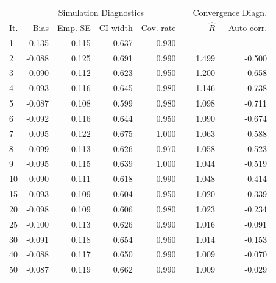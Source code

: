 \documentclass[article]{jss}
\begin{document}
\begin{table}[ht]
\centering
\begin{tabular}{lrrrrrrr}
  \hline
  &\multicolumn{4}{c}{Simulation Diagnostics}& & \multicolumn{2}{c}{Convergence Diagn.} \\
  \cline{2-5} \cline{7-8}
It. & Bias & Emp. SE & CI width & Cov. rate & & $\widehat{R}$ & Auto-corr. \\ 
  \hline
  1 & -0.135 & 0.115 & 0.637 & 0.930 &  & & \\ 
  2 & -0.088 & 0.125 & 0.691 & 0.990 & & 1.499 & -0.500 \\ 
  3 & -0.090 & 0.112 & 0.623 & 0.950 & &  1.200 & -0.658 \\ 
  4 & -0.093 & 0.116 & 0.645 & 0.980 &  & 1.146 & -0.738 \\ 
  5 & -0.087 & 0.108 & 0.599 & 0.980 &  & 1.098 & -0.711 \\ 
  6 & -0.092 & 0.116 & 0.644 & 0.950 & &  1.090 & -0.674 \\ 
  7 & -0.095 & 0.122 & 0.675 & 1.000 & &  1.063 & -0.588 \\ 
  8 & -0.099 & 0.113 & 0.626 & 0.970 & &  1.058 & -0.523 \\ 
  9 & -0.095 & 0.115 & 0.639 & 1.000 & &  1.044 & -0.519 \\ 
  10 & -0.090 & 0.111 & 0.618 & 0.990 & &  1.048 & -0.414 \\ 
  15 & -0.093 & 0.109 & 0.604 & 0.950 & &  1.020 & -0.339 \\ 
  20 & -0.098 & 0.109 & 0.606 & 0.980 & &  1.023 & -0.234 \\ 
  25 & -0.100 & 0.113 & 0.626 & 0.990 &  & 1.016 & -0.091 \\ 
  30 & -0.091 & 0.118 & 0.654 & 0.960 & &  1.014 & -0.153 \\ 
  40 & -0.088 & 0.117 & 0.650 & 0.990 &  & 1.009 & -0.070 \\ 
  50 & -0.087 & 0.119 & 0.662 & 0.990 &  & 1.009 & -0.029 \\ 

\end{tabular}
\end{table}
\end{document}
